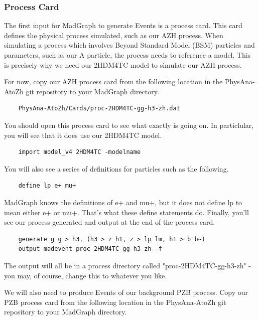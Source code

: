 \documentclass{article}
\begin{document}
\subsubsection{Process Card}

The first input for MadGraph to generate Events is a process card. This card defines the
physical process simulated, such as our AZH process. When simulating a process which involves
Beyond Standard Model (BSM) particles and parameters, such as our A particle, the process
needs to reference a model. This is precisely why we need our 2HDM4TC model to simulate our AZH process.

\bigskip

For now, copy our AZH process card from the following location in the PhysAna-AtoZh
git repository to your MadGraph directory.

\begin{verbatim}
	PhysAna-AtoZh/Cards/proc-2HDM4TC-gg-h3-zh.dat
\end{verbatim}

You should open this process card to see what exactly is going on. In particlular, you will see that it does use our 2HDM4TC model.

\begin{verbatim}
	import model_v4 2HDM4TC -modelname
\end{verbatim}

You will also see a series of definitions for particles such as the following.

\begin{verbatim}
	define lp e+ mu+
\end{verbatim}

MadGraph knows the definitions of e+ and mu+, but it does not define lp to mean either e+ or mu+.
That's what these define statements do. Finally, you'll see our process generated and output at
the end of the process card.

\begin{verbatim}
	generate g g > h3, (h3 > z h1, z > lp lm, h1 > b b~)
	output madevent proc-2HDM4TC-gg-h3-zh -f
\end{verbatim}

The output will all be in a process directory called "proc-2HDM4TC-gg-h3-zh" - you may, of course, change this to whatever you like.

\bigskip

We will also need to produce Events of our background PZB process. Copy our PZB process card
from the following location in the PhysAna-AtoZh git repository to your MadGraph directory.
\end{document}
